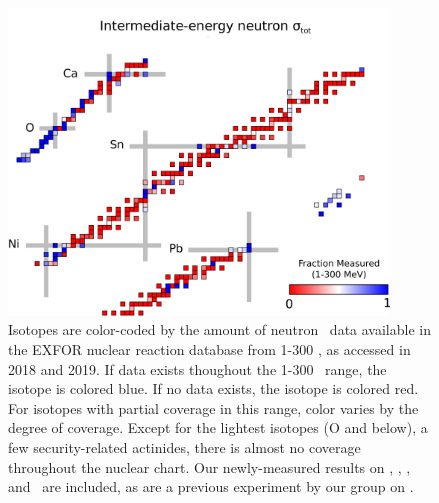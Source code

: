 \begin{figure}
    \centering
    \includegraphics[width=0.9\textwidth]{figures/TCSChart.png}
    \caption[Landscape of existing neutron \tot\ data in 2019]
    {Isotopes are color-coded by the amount of neutron \tot\ data available in the EXFOR nuclear
        reaction database from 1-300 \mega\electronvolt, as accessed in 2018 and 2019. If data exists thoughout the
        1-300 \mega\electronvolt\ range, the isotope
        is colored blue. If no data exists, the isotope is colored red. For
        isotopes with partial coverage in this range, color varies by the degree
        of coverage. Except for the lightest
        isotopes (O and below), a few security-related actinides, there is almost no coverage
        throughout the nuclear chart. Our newly-measured results on \oSixEight, \niEightFour,
        \rhThree, and \snTwelveFour\ are included, as are a previous experiment
        by our group on \caAughtEight \cite{Shane2010}.
    }
    \label{TCSChart}
\end{figure}

